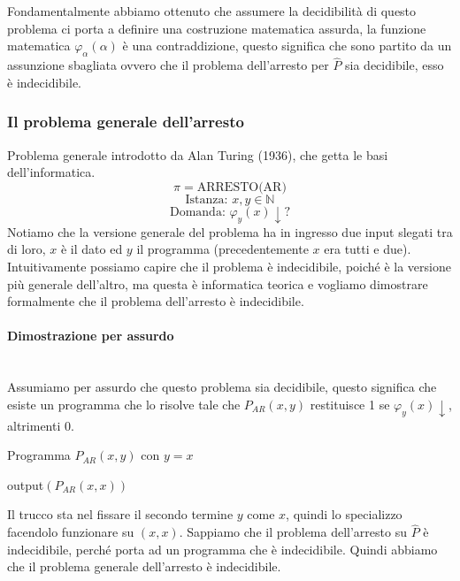 \documentclass{article}
\begin{document}
Fondamentalmente abbiamo ottenuto che assumere la decidibilità di questo problema ci porta
a definire una costruzione matematica assurda, la funzione matematica $\varphi_\alpha(\alpha)$
è una contraddizione, questo significa che sono partito da un assunzione sbagliata ovvero
che il problema dell'arresto per $\hat{P}$ sia decidibile, esso è indecidibile.

\subsubsection{Il problema generale dell'arresto}
Problema generale introdotto da Alan Turing (1936), che getta le basi dell'informatica.
$$\pi=\text{ARRESTO(AR)}$$
$$\text{Istanza: }x,y\in\mathbb{N}$$
$$\text{Domanda: }\varphi_y(x)\downarrow?$$
Notiamo che la versione generale del problema ha in ingresso due input slegati tra di loro,
$x$ è il dato ed $y$ il programma (precedentemente $x$ era tutti e due). Intuitivamente
possiamo capire che il problema è indecidibile, poiché è la versione più generale dell'altro,
ma questa è informatica teorica e vogliamo dimostrare formalmente che il problema dell'arresto
è indecidibile.

\paragraph{Dimostrazione per assurdo}\mbox{}\\
Assumiamo per assurdo che questo problema sia decidibile, questo significa che esiste
un programma che lo risolve tale che $P_{AR}(x,y)$ restituisce 1 se $\varphi_{y}(x)\downarrow$,
altrimenti 0.
\begin{algorithm}[hbt!]
    \caption{Programma $P_{AR}(x,y)$ con $y=x$}\label{alg:p_ass}
    output$(P_{AR}(x,x))$\;
\end{algorithm}
Il trucco sta nel fissare il secondo termine $y$ come $x$, quindi lo specializzo facendolo
funzionare su $(x,x)$.
\newline\newline
Sappiamo che il problema dell'arresto su $\hat{P}$ è indecidibile, perché porta ad un programma
che è indecidibile. Quindi abbiamo che il problema generale dell'arresto è indecidibile.
\end{document}
